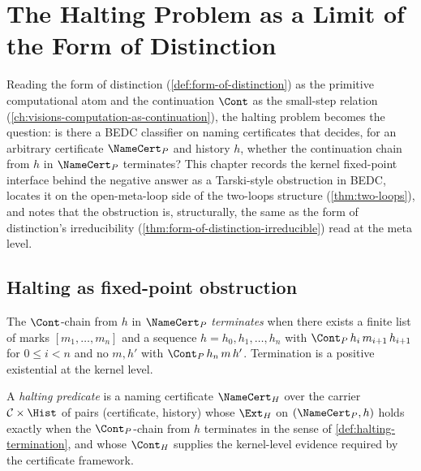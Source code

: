 \chapter{The Halting Problem as a Limit of the Form of Distinction}
\label{ch:visions-halting-as-form-of-distinction-limit}

Reading the form of distinction (\autoref{def:form-of-distinction}) as the primitive computational atom and the continuation $\Cont$ as the small-step relation (\autoref{ch:visions-computation-as-continuation}), the halting problem becomes the question: is there a BEDC classifier on naming certificates that decides, for an arbitrary certificate $\NameCert_{P}$ and history $h$, whether the continuation chain from $h$ in $\NameCert_{P}$ terminates? This chapter records the kernel fixed-point interface behind the negative answer as a Tarski-style obstruction in BEDC, locates it on the open-meta-loop side of the two-loops structure (\autoref{thm:two-loops}), and notes that the obstruction is, structurally, the same as the form of distinction's irreducibility (\autoref{thm:form-of-distinction-irreducible}) read at the meta level.

\section{Halting as fixed-point obstruction}
\label{sec:halting-as-form-of-distinction-fixed-point}

\begin{definition}
\label{def:halting-termination}
The $\Cont$-chain from $h$ in $\NameCert_{P}$ \emph{terminates} when there exists a finite list of marks $[m_1, \ldots, m_n]$ and a sequence $h = h_0, h_1, \ldots, h_n$ with $\Cont_P\,h_i\,m_{i+1}\,h_{i+1}$ for $0 \le i < n$ and no $m, h'$ with $\Cont_P\,h_n\,m\,h'$. Termination is a positive existential at the kernel level.
\end{definition}

\begin{definition}
\label{def:halting-predicate}
A \emph{halting predicate} is a naming certificate $\NameCert_H$ over the carrier $\mathcal{C} \times \Hist$ of pairs (certificate, history) whose $\Ext_H$ on $(\NameCert_P, h)$ holds exactly when the $\Cont_P$-chain from $h$ terminates in the sense of \autoref{def:halting-termination}, and whose $\Cont_H$ supplies the kernel-level evidence required by the certificate framework.
\end{definition}

